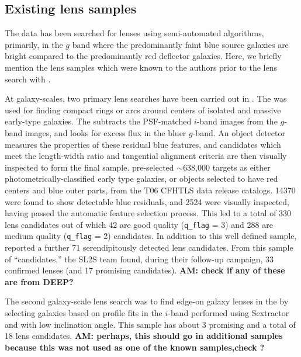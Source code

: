 \documentclass[useAMS,usenatbib,a4paper]{mn2e}
\begin{document}

\subsection{Existing \cfhtls lens samples}
\label{sec:data:kls}

The \cfhtls data has been searched for lenses using semi-automated algorithms,
primarily, in the $g$ band where the predominantly  faint blue  source
galaxies are bright compared to the predominantly red deflector galaxies.
Here, we briefly mention the lens samples which were known to the authors
prior to the lens search with \sw.

At galaxy-scales, two primary lens searches have been carried out in
\cfhtls. The \rf \citep{Gavazzi2014} was used for finding compact rings
or arcs around centers of isolated and massive early-type galaxies. The
\rf subtracts the PSF-matched $i$-band images from the $g$-band images,
and looks for excess flux in the bluer $g$-band. An object detector
measures the properties of these residual blue features, and candidates
which meet the length-width ratio and tangential alignment criteria are
then visually inspected to form the final sample. \citet{Gavazzi2014}
pre-selected $\sim$638,000 targets as either photometrically-classified
early type galaxies, or objects selected to have red centers and blue
outer parts, from the T06 CFHTLS data release catalogs.  14370 were
found to show detectable blue residuals, and 2524 were visually
inspected, having passed the automatic feature selection process. This
led to a total of 330 lens candidates out of which 42 are good quality
(\texttt{q\_flag} = 3) and 288 are medium quality (\texttt{q\_flag} = 2)
candidates. In addition to this well defined sample, \citet{Gavazzi2014}
reported a further 71 serendipitously detected lens candidates.  From
this sample of ``\rf candidates,'' the SL2S team found, during their
follow-up campaign, 33 confirmed lenses (and 17 promising candidates).
{\bf AM: check if any of these are from \cfhtls DEEP?}

The second galaxy-scale lens search was to find edge-on galaxy lenses in the
\cfhtls \citep{Sygnet2010} by selecting galaxies based on profile fits in the
$i$-band performed using {\sc Sextractor} and with low inclination angle. This
sample has about 3 promising and a total of 18 lens candidates.
{\bf AM: perhaps, this should go in additional samples because this was not
used as one of the known samples,check ?}
\end{document}
